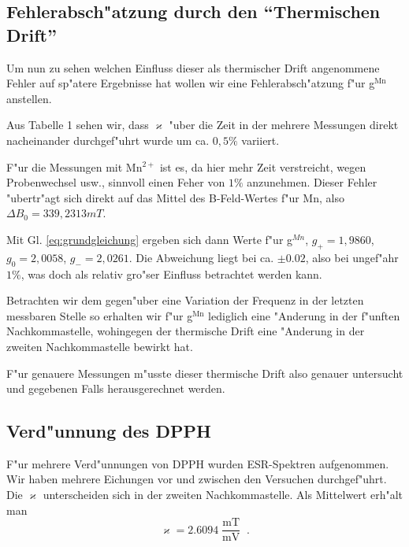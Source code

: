 \documentclass[a4paper,12pt]{article}
\begin{document}
\subsection{Fehlerabsch"atzung durch den "`Thermischen Drift"'}
\label{sec:fehl_des_therm_drifts}

Um nun zu sehen welchen Einfluss dieser als thermischer Drift
angenommene Fehler auf sp"atere Ergebnisse hat wollen wir eine
Fehlerabsch"atzung f"ur g$^\text{Mn}$ anstellen.

Aus Tabelle 1 sehen wir, dass $\varkappa$ "uber die Zeit in der
mehrere Messungen direkt nacheinander durchgef"uhrt wurde um
ca. $0,5\%$ variiert.

F"ur die Messungen mit Mn$^{2+}$ ist es, da hier mehr Zeit
verstreicht, wegen Probenwechsel usw., sinnvoll einen Feher von $1\%$
anzunehmen. Dieser Fehler "ubertr"agt sich direkt auf das Mittel des
B-Feld-Wertes f"ur Mn, also $\Delta {B_0} = 339,2313 mT$.

Mit Gl. \eqref{eq:grundgleichung} ergeben sich dann Werte f"ur
g$^{Mn}$, $g_+ = 1,9860$, $g_0 = 2,0058$, $g_- = 2,0261$. Die
Abweichung liegt bei ca. $\pm 0.02$, also bei ungef"ahr $1\%$, was doch
als relativ gro"ser Einfluss betrachtet werden kann.

Betrachten wir dem gegen"uber eine Variation der Frequenz in der
letzten messbaren Stelle so erhalten wir f"ur g$^\text{Mn}$ lediglich
eine "Anderung in der f"unften Nachkommastelle, wohingegen der thermische
Drift eine "Anderung in der zweiten Nachkommastelle bewirkt hat.

F"ur genauere Messungen m"usste dieser thermische Drift also genauer
untersucht und gegebenen Falls herausgerechnet werden.







\subsection{Verd"unnung des DPPH}
\label{sec:verdunnung_des_dpph}


F"ur mehrere Verd"unnungen von DPPH wurden ESR-Spektren aufgenommen.
Wir haben mehrere Eichungen vor und zwischen den Versuchen
durchgef"uhrt. Die $\varkappa$ unterscheiden sich in der zweiten
Nachkommastelle. Als Mittelwert erh"alt man
\begin{equation*}
  \varkappa = 2.6094 \frac{\operatorname{mT}}{\operatorname{mV}} \;.
\end{equation*}
\end{document}
